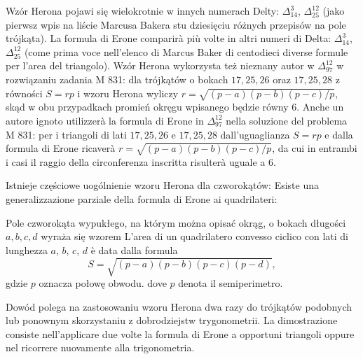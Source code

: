 Wzór Herona pojawi się wielokrotnie w innych numerach Delty: $\Delta_{14}^3$, $\Delta_{25}^{12}$ (jako pierwsz wpis na liście Marcusa Bakera stu dziesięciu różnych przepisów na pole trójkąta). %
La formula di Erone comparirà più volte in altri numeri di Delta: $\Delta_{14}^3$, $\Delta_{25}^{12}$ (come prima voce nell'elenco di Marcus Baker di centodieci diverse formule per l'area del triangolo). %
Wzór Herona wykorzysta też nieznany autor w $\Delta_{97}^{12}$ w rozwiązaniu zadania M 831: dla trójkątów o bokach $17, 25, 26$ oraz $17, 25, 28$ z równości $S = rp$ i wzoru Herona wyliczy $r = \sqrt{(p-a)(p-b)(p-c)/p}$, skąd w obu przypadkach promień okręgu wpisanego będzie równy $6$. %
Anche un autore ignoto utilizzerà la formula di Erone in $\Delta_{97}^{12}$ nella soluzione del problema M 831: per i triangoli di lati $17, 25, 26$ e $17, 25, 28$ dall'uguaglianza $S = rp$ e dalla formula di Erone ricaverà $r = \sqrt{(p-a)(p-b)(p-c)/p}$, da cui in entrambi i casi il raggio della circonferenza inscritta risulterà uguale a $6$. %


Istnieje częściowe uogólnienie wzoru Herona dla czworokątów: %
Esiste una generalizzazione parziale della formula di Erone ai quadrilateri: %

\begin{proposition}
[wzór Brahmagupty] %
[formula di Brahmagupta] %
\label{brahmagupta_formula}%
    Pole czworokąta wypukłego, na którym można opisać okrąg, o bokach długości $a, b, c, d$ wyraża się wzorem %
    L'area di un quadrilatero convesso ciclico con lati di lunghezza $a$, $b$, $c$, $d$ è data dalla formula %
    \begin{equation}
        S = \sqrt{(p-a)(p-b)(p-c)(p-d)},
    \end{equation}
    gdzie $p$ oznacza połowę obwodu. %
    dove $p$ denota il semiperimetro. %
\end{proposition}

Dowód polega na zastosowaniu wzoru Herona dwa razy do trójkątów podobnych lub ponownym skorzystaniu z dobrodziejstw trygonometrii. %
La dimostrazione consiste nell'applicare due volte la formula di Erone a opportuni triangoli oppure nel ricorrere nuovamente alla trigonometria. %

